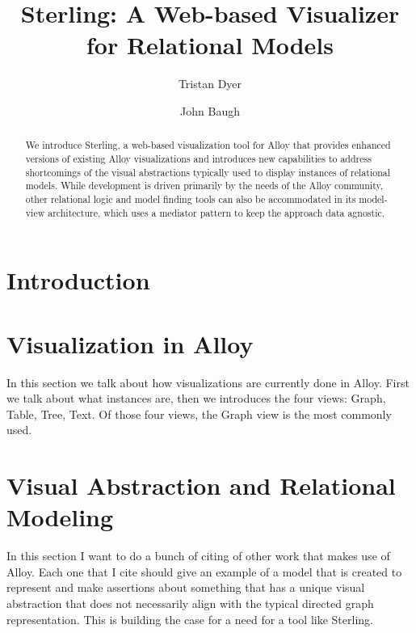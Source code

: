 \documentclass[runningheads]{llncs}
\begin{document}
\title{Sterling: A Web-based Visualizer for Relational Models}
\author{Tristan Dyer  \and John Baugh }



\maketitle

\begin{abstract}
We introduce Sterling, a web-based visualization tool for Alloy that provides enhanced versions of existing Alloy visualizations and introduces new capabilities to address shortcomings of the visual abstractions typically used to display instances of relational models. While development is driven primarily by the needs of the Alloy community, other relational logic and model finding tools can also be accommodated in its model-view architecture, which uses a mediator pattern to keep the approach data agnostic.
\end{abstract}

\section{Introduction}
\label{introduction}

\section{Visualization in Alloy}
\label{alloy}

In this section we talk about how visualizations are currently done in Alloy. First we talk about what instances are, then we introduces the four views: Graph, Table, Tree, Text. Of those four views, the Graph view is the most commonly used.

\section{Visual Abstraction and Relational Modeling}
\label{visual-abstraction}

In this section I want to do a bunch of citing of other work that makes use of Alloy. Each one that I cite should give an example of a model that is created to represent and make assertions about something that has a unique visual abstraction that does not necessarily align with the typical directed graph representation. This is building the case for a need for a tool like Sterling.
\end{document}
